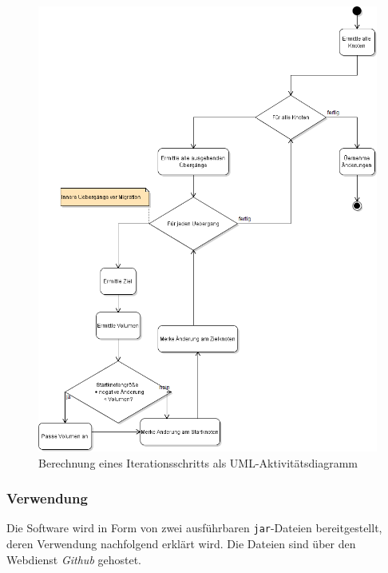 \begin{figure}
\includegraphics[width=\textwidth]{res/diagramme/Berechnung.png}
\caption{Berechnung eines Iterationsschritts als UML-Aktivitätsdiagramm}\label{fig:ssec:sw:activity}
\end{figure}
\subsubsection*{Verwendung}
Die Software wird in Form von zwei ausführbaren \texttt{jar}-Dateien bereitgestellt, deren Verwendung nachfolgend erklärt wird. Die Dateien sind über den Webdienst \emph{Github} gehostet. 


